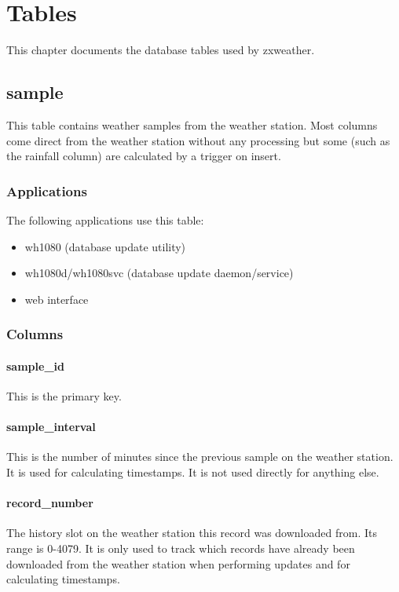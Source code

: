 \documentclass[a4paper,10pt]{book}
\begin{document}
\chapter{Tables}
\label{cha_tables}

This chapter documents the database tables used by zxweather.

\section{sample}
This table contains weather samples from the weather station. Most columns come direct from the weather station without any processing but some (such as the rainfall column) are calculated by a trigger on insert.

\subsection{Applications}
The following applications use this table:
\begin{itemize}
\item wh1080 (database update utility)
\item wh1080d/wh1080svc (database update daemon/service)
\item web interface
\end{itemize}

\subsection{Columns}
\subsubsection{sample\_id}
This is the primary key.

\subsubsection{sample\_interval}
This is the number of minutes since the previous sample on the weather station. It is used for calculating timestamps. It is not used directly for anything else.

\subsubsection{record\_number}
The history slot on the weather station this record was downloaded from. Its range is 0-4079. It is only used to track which records have already been downloaded from the weather station when performing updates and for calculating timestamps.
\end{document}
